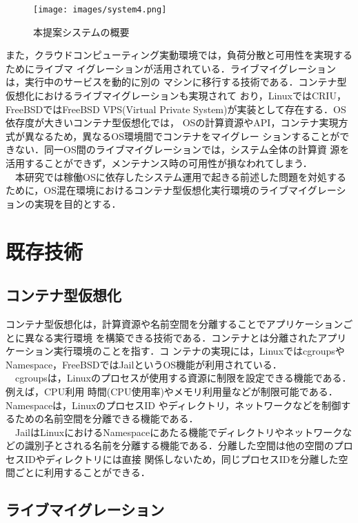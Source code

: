 \documentclass[11pt]{jarticle}
\begin{document}
\begin{figure*}[t]
  \centering
  \texttt{[image: images/system4.png]} \\
  \caption{本提案システムの概要}
  \label{fig:system}
\end{figure*}

また，クラウドコンピューティング実動環境では，負荷分散と可用性を実現するためにライブマ
イグレーションが活用されている．ライブマイグレーションは，実行中のサービスを動的に別の
マシンに移行する技術である．コンテナ型仮想化におけるライブマイグレーションも実現されて
おり，LinuxではCRIU\cite{container_live,criu}，FreeBSDではFreeBSD VPS(Virtual Private
 System)\cite{freebsd-vps}が実装として存在する．OS依存度が大きいコンテナ型仮想化では，
 OSの計算資源やAPI，コンテナ実現方式が異なるため，異なるOS環境間でコンテナをマイグレー
 ションすることができない．同一OS間のライブマイグレーションでは，システム全体の計算資
 源を活用することができず，メンテナンス時の可用性が損なわれてしまう．\\
　本研究では稼働OSに依存したシステム運用で起きる前述した問題を対処するために，OS混在環境におけるコンテナ型仮想化実行環境のライブマイグレーションの実現を目的とする．

\section{既存技術}
\subsection{コンテナ型仮想化}
\label{sec:container}

コンテナ型仮想化は，計算資源や名前空間を分離することでアプリケーションごとに異なる実行環境
を構築できる技術である．コンテナとは分離されたアプリケーション実行環境のことを指す．コ
ンテナの実現には，LinuxではcgroupsやNamespace，FreeBSDではJailというOS機能が利用されている．\\
　cgroupsは，Linuxのプロセスが使用する資源に制限を設定できる機能である．例えば，CPU利用
時間(CPU使用率)やメモリ利用量などが制限可能である．Namespaceは，LinuxのプロセスID
やディレクトリ，ネットワークなどを制御するための名前空間を分離できる機能である．\\
　JailはLinuxにおけるNamespaceにあたる機能でディレクトリやネットワークなどの識別子とされる名前を分離する機能である．分離した空間は他の空間のプロセスIDやディレクトリには直接
関係しないため，同じプロセスIDを分離した空間ごとに利用することができる．

\subsection{ライブマイグレーション}
\end{document}
